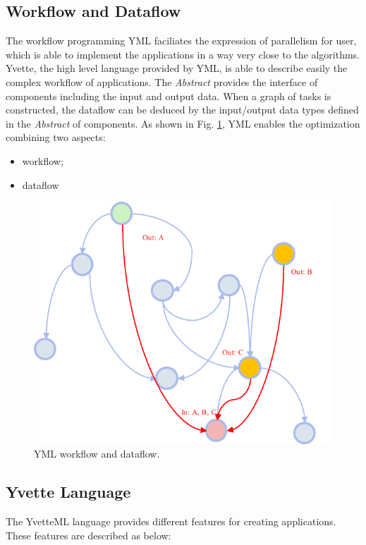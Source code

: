 \subsection{Workflow and Dataflow}

The workflow programming YML faciliates the expression of parallelism for user, which is able to implement the applications in a way very close to the algorithms. Yvette, the high level language provided by YML, is able to describe easily the complex workflow of applications. The \textit{Abstract} provides the interface of components including the input and output data. When a graph of tasks is constructed, the dataflow can be deduced by the input/output data types defined in the \textit{Abstract} of components. As shown in Fig. \ref{fig:yml-dataflow}, YML enables the optimization combining two aspects:

\begin{itemize}
	\item workflow;
	\item dataflow
\end{itemize}

\begin{figure}[htbp]
	\centering
	\includegraphics[width=.72\linewidth]{fig/dataflow.pdf}
	\caption{YML workflow and dataflow.}
	\label{fig:yml-dataflow}
\end{figure}

\subsection{Yvette Language}

The YvetteML language provides different features for creating applications. These features are described as below:

